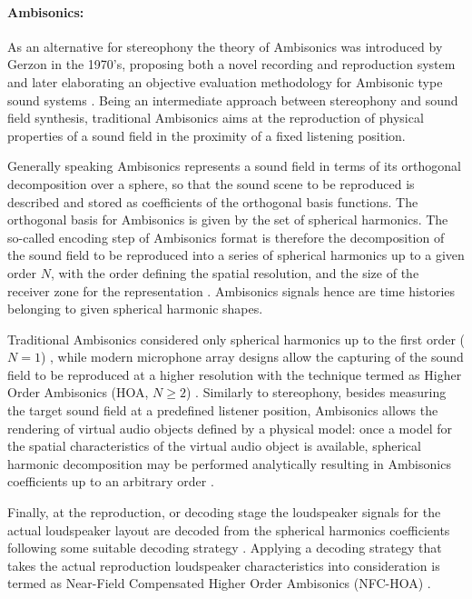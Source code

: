 \paragraph{Ambisonics:}
As an alternative for stereophony the theory of Ambisonics was introduced by Gerzon in the 1970's, proposing both a novel recording and reproduction system \cite{gerzon1973periphony} and later elaborating an objective evaluation methodology for Ambisonic type sound systems \cite{gerzon1992general}.
Being an intermediate approach between stereophony and sound field synthesis, traditional Ambisonics aims at the reproduction of physical properties of a sound field in the proximity of a fixed listening position.

Generally speaking Ambisonics represents a sound field in terms of its orthogonal decomposition over a sphere, so that the sound scene to be reproduced is described and stored as coefficients of the orthogonal basis functions.
The orthogonal basis for Ambisonics is given by the set of spherical harmonics.
The so-called encoding step of Ambisonics format is therefore the decomposition of the sound field to be reproduced into a series of spherical harmonics up to a given order $N$, with the order defining the spatial resolution, and the size of the receiver zone for the representation \cite{gerzon1985ambisonics}.
Ambisonics signals hence are time histories belonging to given spherical harmonic shapes.

Traditional Ambisonics considered only spherical harmonics up to the first order ($N = 1$) \cite{gerzon1975the}, while modern microphone array designs allow the capturing of the sound field to be reproduced at a higher resolution with the technique termed as Higher Order Ambisonics (HOA, $N \geq 2$) \cite{5745011, 5744968, 5356221}.
Similarly to stereophony, besides measuring the target sound field at a predefined listener position, Ambisonics allows the rendering of virtual audio objects defined by a physical model:
once a model for the spatial characteristics of the virtual audio object is available, spherical harmonic decomposition may be performed analytically resulting in Ambisonics coefficients up to an arbitrary order \cite{4517624, Ahrens2010phd}.

Finally, at the reproduction, or decoding stage the loudspeaker signals for the actual loudspeaker layout are decoded from the spherical harmonics coefficients following some suitable decoding strategy \cite{Daniel2000:phd, Daniel2003b, zotter:hal-01106738, zotter2012all}.
Applying a decoding strategy that takes the actual reproduction loudspeaker characteristics into consideration is termed as Near-Field Compensated Higher Order Ambisonics (NFC-HOA) \cite{Daniel2003}.

